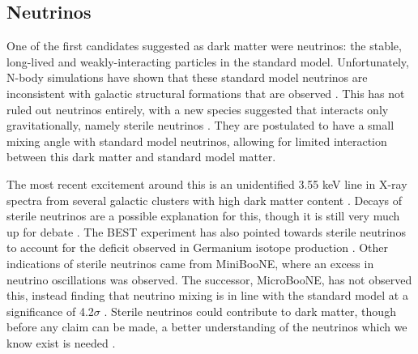 \subsection{Neutrinos}
\par
One of the first candidates suggested as dark matter were neutrinos: the stable, long-lived and weakly-interacting particles in the standard model.
Unfortunately, N-body simulations have shown that these standard model neutrinos are inconsistent with galactic structural formations that are observed \cite{neutrinos_and_galaxy_clustering_ref}. 
This has not ruled out neutrinos entirely, with a new species suggested that interacts only gravitationally, namely sterile neutrinos \cite{sterile_neutrinos_ref}.
They are postulated to have a small mixing angle with standard model neutrinos, allowing for limited interaction between this dark matter and standard model matter.
\par
The most recent excitement around this is an unidentified 3.55 keV line in X-ray spectra from several galactic clusters with high dark matter content \cite{sterile_neutrino_xray_decay_ref}.
Decays of sterile neutrinos are a possible explanation for this, though it is still very much up for debate \cite{xray_from_sterile_neutrons_2_ref, xray_from_sterile_neutrons_3_ref}.
The BEST experiment has also pointed towards sterile neutrinos to account for the deficit observed in Germanium isotope production \cite{best_sterile_neutrino_result_ref,best_sterile_neutrino_2_ref}.
Other indications of sterile neutrinos came from MiniBooNE, where an excess in neutrino oscillations was observed.
The successor, MicroBooNE, has not observed this, instead finding that neutrino mixing is in line with the standard model at a significance of 4.2$\sigma$ \cite{miniboone_and_microboone_sterile_neutrino_ref}.
Sterile neutrinos could contribute to dark matter, though before any claim can be made, a better understanding of the neutrinos which we know exist is needed \cite{sterile_neutrino_as_dm_ref, sterile_neutrinos_dm_ref}.


